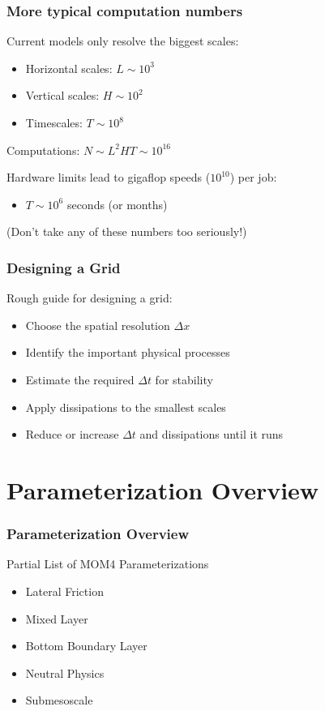 \documentclass{beamer}
\begin{document}
\begin{frame}
    \frametitle{More typical computation numbers}
    
    Current models only resolve the biggest scales:
    \begin{itemize}
        \item Horizontal scales: $L \sim 10^3$
        \item Vertical scales: $H \sim 10^2$
        \item Timescales: $T \sim 10^{8}$
    \end{itemize}
    Computations: $N \sim L^2 H T \sim 10^{16}$
    
    \vspace{10pt}
    
    Hardware limits lead to gigaflop speeds ($10^{10}$) per job:
    \begin{itemize}
        \item $T \sim 10^{6}$ seconds (or months)
    \end{itemize}
    (Don't take any of these numbers too seriously!)
\end{frame}

\begin{frame}
    \frametitle{Designing a Grid}
    
    Rough guide for designing a grid:
    \begin{itemize}
        \item Choose the spatial resolution $\Delta x$
        \item Identify the important physical processes
        \item Estimate the required $\Delta t$ for stability
        \item Apply dissipations to the smallest scales
        \item Reduce or increase $\Delta t$ and dissipations until it runs
    \end{itemize}
\end{frame}

\section{Parameterization Overview}
\begin{frame}
    \frametitle{Parameterization Overview}
    
    Partial List of MOM4 Parameterizations
    \begin{itemize}
        \item Lateral Friction
        \item Mixed Layer
        \item Bottom Boundary Layer
        \item Neutral Physics
        \item Submesoscale
    \end{itemize}
\end{frame}
\end{document}
